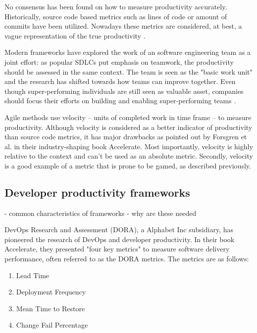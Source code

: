No consensus has been found on how to measure productivity accurately\cite{oliveira_code_2020}. Historically, source code based metrics such as lines of code or amount of commits have been utilized\cite{oliveira_code_2020}. Nowadays these metrics are considered, at best, a vague representation of the true productivity \cite{forsgren_space_2021}.

Modern frameworks have explored the work of an software engineering team as a joint effort: as popular SDLCs put emphasis on teamwork, the productivity should be assessed in the same context. The team is seen as the "basic work unit" \cite{moe_overcoming_2010} and the research has shifted towards how teams can improve together. Even though super-performing individuals are still seen as valuable asset, companies should focus their efforts on building and enabling super-performing teams \cite{forsgren_space_2021}. 

Agile methods use velocity – units of completed work in time frame – to measure productivity. Although velocity is considered as a better indicator of productivity than source code metrics, it has major drawbacks as pointed out by Forsgren et al. in their industry-shaping book Accelerate. Most importantly, velocity is highly relative to the context and can't be used as an absolute metric. Secondly, velocity is a good example of a metric that is prone to be gamed, as described previously. \cite{forsgren_accelerate_2018}
 
\subsection{Developer productivity frameworks}

- common characteristics of frameworks
- why are these needed


DevOps Research and Assessment (DORA), a Alphabet Inc subsidiary, has pioneered the research of DevOps and developer productivity. In their book Accelerate, they presented "four key metrics" to measure software delivery performance, often referred to as the DORA metrics. The metrics are as follows: 

\begin{enumerate}
\item Lead Time
\item Deployment Frequency
\item Mean Time to Restore
\item Change Fail Percentage
\end{enumerate}

